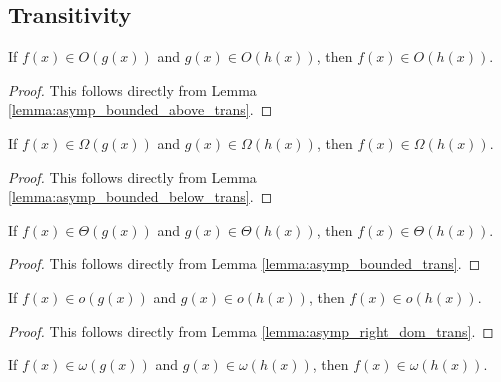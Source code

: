 \subsection{Transitivity}

\begin{lemma}
    \label{lemma:O_trans}
    \leanok
    If $f(x) \in O(g(x))$ and $g(x) \in O(h(x))$, then $f(x) \in O(h(x))$.
\end{lemma}

\begin{proof}
    \leanok
    This follows directly from Lemma \ref{lemma:asymp_bounded_above_trans}.
\end{proof}

\begin{lemma}
    \label{lemma:Omega_trans}
    \leanok
    If $f(x) \in \Omega(g(x))$ and $g(x) \in \Omega(h(x))$, then $f(x) \in \Omega(h(x))$.
\end{lemma}

\begin{proof}
    \leanok
    This follows directly from Lemma \ref{lemma:asymp_bounded_below_trans}.
\end{proof}

\begin{lemma}
    \label{lemma:theta_trans}
    \leanok
    If $f(x) \in \Theta(g(x))$ and $g(x) \in \Theta(h(x))$, then $f(x) \in \Theta(h(x))$.
\end{lemma}

\begin{proof}
    \leanok
    This follows directly from Lemma \ref{lemma:asymp_bounded_trans}.
\end{proof}

\begin{lemma}
    \label{lemma:o_trans}
    \leanok
    If $f(x) \in o(g(x))$ and $g(x) \in o(h(x))$, then $f(x) \in o(h(x))$. 
\end{lemma}

\begin{proof}
    \leanok
    This follows directly from Lemma \ref{lemma:asymp_right_dom_trans}.
\end{proof}

\begin{lemma}
    \label{lemma:omega_trans}
    \leanok
    If $f(x) \in \omega(g(x))$ and $g(x) \in \omega(h(x))$, then $f(x) \in \omega(h(x))$.
\end{lemma}

